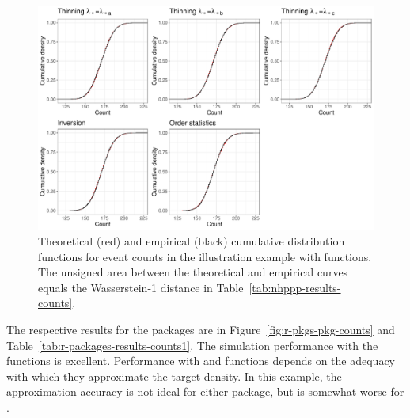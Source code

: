 \documentclass[article,nojss]{jss}\usepackage[]{graphicx}\usepackage[]{xcolor}
\makeatletter
\def\maxwidth{ %
  \ifdim\Gin@nat@width>\linewidth
    \linewidth
  \else
    \Gin@nat@width
  \fi
}
\newenvironment{knitrout}{}{} %
\makeatother
\begin{document}
\begin{knitrout}
\color{fgcolor}\begin{figure}
\includegraphics[width=\maxwidth]{figure/ecdf-nhppp-pkg-counts-1} \caption{Theoretical (red) and empirical (black) cumulative distribution functions for event counts in the illustration example with  functions. The unsigned area between the theoretical and empirical curves equals the Wasserstein-1 distance in Table~\ref{tab:nhppp-results-counts}.}\label{fig:ecdf-nhppp-pkg-counts}
\end{figure}

\end{knitrout}





The respective results for the  packages are in Figure~\ref{fig:r-pkgs-pkg-counts} and Table~\ref{tab:r-packages-results-counts1}. The simulation performance with the  functions is excellent. Performance with  and  functions depends on the adequacy with which they approximate the target density. In this example, the approximation accuracy is not ideal for either package, but is somewhat worse for .
\end{document}
